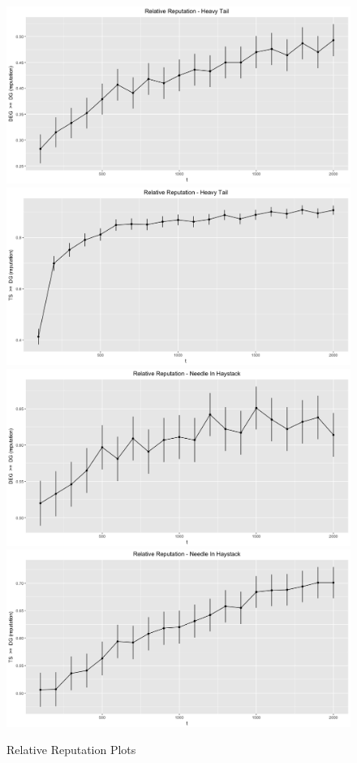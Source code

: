 \documentclass{article}
\theoremstyle{definition}
\begin{document}
\begin{figure}
\caption{Relative Reputation Plots}
\includegraphics[scale=0.2]{"figures/deg_dg_ht_10_prelim"}
\includegraphics[scale=0.2]{"figures/ts_dg_ht_10_prelim"} \\
\includegraphics[scale=0.2]{"figures/deg_dg_nih_10_prelim"}
\includegraphics[scale=0.2]{"figures/ts_dg_nih_10_prelim"} \\

\end{figure}
\end{document}
